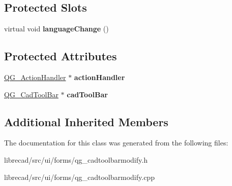 \subsection*{Protected Slots}
\begin{DoxyCompactItemize}
\item 
\hypertarget{classQG__CadToolBarModify_a330cc5a6c31f7850c41e6c462c66f5ca}{virtual void {\bfseries language\-Change} ()}\label{classQG__CadToolBarModify_a330cc5a6c31f7850c41e6c462c66f5ca}

\end{DoxyCompactItemize}
\subsection*{Protected Attributes}
\begin{DoxyCompactItemize}
\item 
\hypertarget{classQG__CadToolBarModify_a80998931026fa1bda6b9cc608e490167}{\hyperlink{classQG__ActionHandler}{Q\-G\-\_\-\-Action\-Handler} $\ast$ {\bfseries action\-Handler}}\label{classQG__CadToolBarModify_a80998931026fa1bda6b9cc608e490167}

\item 
\hypertarget{classQG__CadToolBarModify_a7f5d28bc3c6de7e0a5c80d35a12e98ae}{\hyperlink{classQG__CadToolBar}{Q\-G\-\_\-\-Cad\-Tool\-Bar} $\ast$ {\bfseries cad\-Tool\-Bar}}\label{classQG__CadToolBarModify_a7f5d28bc3c6de7e0a5c80d35a12e98ae}

\end{DoxyCompactItemize}
\subsection*{Additional Inherited Members}


The documentation for this class was generated from the following files\-:\begin{DoxyCompactItemize}
\item 
librecad/src/ui/forms/qg\-\_\-cadtoolbarmodify.\-h\item 
librecad/src/ui/forms/qg\-\_\-cadtoolbarmodify.\-cpp\end{DoxyCompactItemize}
